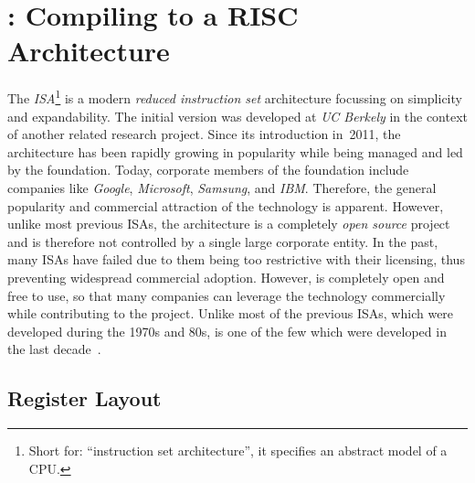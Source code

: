 \newpage
\section{\riscv{}: Compiling to a RISC Architecture}

The \emph{\riscv{}} \emph{ISA}\footnote{Short for: \enquote{instruction set architecture}, it specifies an abstract model of a CPU.} is a modern \emph{reduced instruction set} architecture focussing on simplicity and expandability.
The initial version was developed at \emph{UC Berkely} in the context of another related research project.
Since its introduction in~2011, the architecture has been rapidly growing in popularity while being managed and led by the \riscv{} foundation.
Today, corporate members of the \riscv{} foundation include companies like \emph{Google}, \emph{Microsoft}, \emph{Samsung}, and \emph{IBM}.
Therefore, the general popularity and commercial attraction of the technology is apparent.
However, unlike most previous ISAs, the \riscv{} architecture is a completely \emph{open source} project and is therefore not controlled by a single large corporate entity.
In the past, many ISAs have failed due to them being too restrictive with their licensing, thus preventing widespread commercial adoption.
However, \riscv{} is completely open and free to use, so that many companies can leverage the technology commercially while contributing to the project.
Unlike most of the previous ISAs, which were developed during the 1970s and 80s, \riscv{} is one of the few which were developed in the last decade~\cite[Preface]{Patterson2017}.

\subsection{Register Layout}

